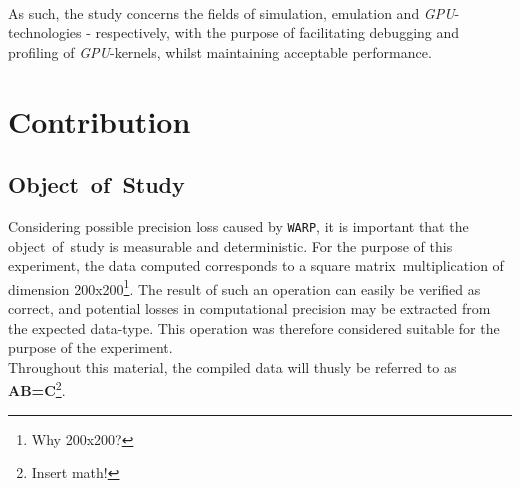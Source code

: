 \documentclass[fleqn,10pt]{SelfArx} %
\begin{document}
\\
As such, the study concerns the fields of simulation, emulation and \textit{GPU}-technologies - respectively, with the purpose of facilitating debugging and profiling of \textit{GPU}-kernels, whilst maintaining acceptable performance.

\section{Contribution}
\label{sec:contribution}

\subsection{Object~of~Study}
\label{sec:contribution:objectofstudy}
Considering possible precision loss caused by \texttt{WARP}, it is important that the object~of~study is measurable and deterministic. For the purpose of this experiment, the data computed corresponds to a square matrix~multiplication of dimension 200x200\footnote{Why 200x200?}. The result of such an operation can easily be verified as correct, and potential losses in computational precision may be extracted from the expected data-type. This operation was therefore considered suitable for the purpose of the experiment.\\
Throughout this material, the compiled data will thusly be referred to as \textbf{AB=C}\footnote{Insert math!}.
\end{document}
